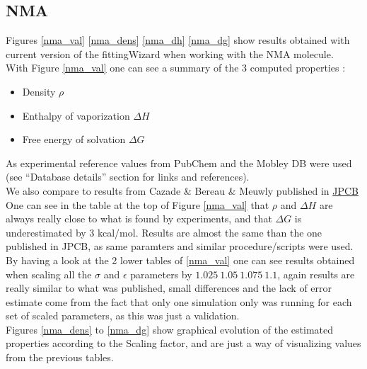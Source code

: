 \documentclass[12pt,a4paper]{article}
\begin{document}
\clearpage


\subsection{NMA}
Figures \ref{nma_val} \ref{nma_dens} \ref{nma_dh} \ref{nma_dg} show results obtained with current 
version of the fittingWizard when working with the NMA molecule.\\

With Figure \ref{nma_val} one can see a summary of the 3 computed properties : 

\begin{itemize}
\item Density $\rho$
\item Enthalpy of vaporization $\Delta H$
\item Free energy of solvation $\Delta G$
\end{itemize}

As experimental reference values from PubChem and the Mobley DB were used (see ``Database details'' 
section for links and references).\\

We also compare to results from Cazade \& Bereau \& Meuwly published in 
\href{http://pubs.acs.org/doi/abs/10.1021/jp5011692}{JPCB} \\

One can see in the table at the top of Figure \ref{nma_val} that $\rho$ and $\Delta H$ are always 
really close to what is found by experiments, and 
that $\Delta G$ is underestimated by 3 kcal/mol. Results are almost the same than the one published 
in JPCB, as same paramters and similar procedure/scripts were used.\\

By having a look at the 2 lower tables of \ref{nma_val} one can see results obtained when scaling 
all the $\sigma$ and $\epsilon$ parameters by $1.025~1.05~1.075~1.1$, again results are really 
similar to what was published, small differences and the lack of error estimate come from the fact 
that only one simulation only was running for each set of scaled parameters, as this was just a 
validation.\\

Figures \ref{nma_dens} to \ref{nma_dg} show graphical evolution of the estimated properties 
according to the Scaling factor, and are just a way of visualizing values from the previous tables.
\end{document}
